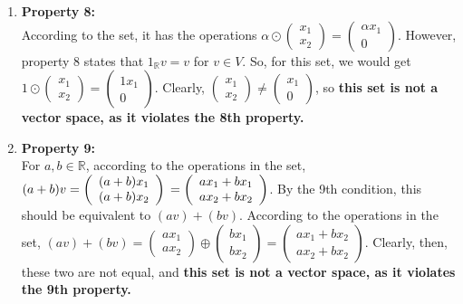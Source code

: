 \documentclass{article}
\begin{document}
\begin{enumerate}
\begin{enumerate}
\item \textbf{Property 8:} \\ According to the set, it has the operations $\alpha \odot \left(\begin{array}{c} x_1 \\ x_2 \end{array} \right) =  \left(\begin{array}{c} \alpha x_1 \\ 0 \end{array} \right)$. However, property 8 states that $1_{\mathbb{R}} v = v$ for $v \in V$. So, for this set, we would get $1 \odot \left(\begin{array}{c} x_1 \\ x_2 \end{array} \right) =  \left(\begin{array}{c} 1x_1 \\ 0 \end{array} \right)$. Clearly, $\left(\begin{array}{c} x_1 \\ x_2 \end{array} \right) \neq \left(\begin{array}{c} x_1 \\ 0 \end{array} \right) $, so \textbf{this set is not a vector space, as it violates the 8th property.}

\item \textbf{Property 9:} \\ For $a,b \in \mathbb{R}$, according to the operations in the set, $(a + b) v = 
\left(\begin{array}{c} (a + b) x_1 \\ (a + b) x_2 \end{array} \right) \\ = \left(\begin{array}{c} a x_1 + b x_1 \\ a x_2 + b x_2 \end{array} \right)$. By the 9th condition, this should be equivalent to $(av) + (bv)$. According to the operations in the set, $(av) + (bv) = \left(\begin{array}{c} a x_1 \\ a x_2 \end{array} \right) \oplus \left(\begin{array}{c} b x_1 \\ b x_2 \end{array} \right) = \left(\begin{array}{c} a x_1 + b x_2 \\ a x_2 + b x_2 \end{array} \right)$. Clearly, then, these two are not equal, and \textbf{this set is not a vector space, as it violates the 9th property.}


\end{enumerate}
\end{enumerate}
\end{document}
